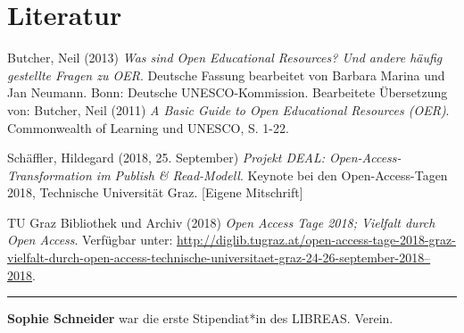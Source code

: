 \documentclass[a4paper,
fontsize=11pt,
oneside,
numbers=noperiodatend,
parskip=half-,
bibliography=totoc,
final
]{scrartcl}
\begin{document}
\hypertarget{literatur}{%
\section{Literatur}\label{literatur}}

Butcher, Neil (2013) \emph{Was sind Open Educational Resources? Und
andere häufig gestellte Fragen zu OER}. Deutsche Fassung bearbeitet von
Barbara Marina und Jan Neumann. Bonn: Deutsche UNESCO-Kommission.
Bearbeitete Übersetzung von: Butcher, Neil (2011) \emph{A Basic Guide to
Open Educational Resources (OER)}. Commonwealth of Learning und UNESCO,
S. 1-22.

Schäffler, Hildegard (2018, 25. September) \emph{Projekt DEAL:
Open-Access-Transformation im Publish \& Read-Modell}. Keynote bei den
Open-Access-Tagen 2018, Technische Universität Graz. {[}Eigene
Mitschrift{]}

TU Graz Bibliothek und Archiv (2018) \emph{Open Access Tage 2018;
Vielfalt durch Open Access}. Verfügbar unter:
\href{http://diglib.tugraz.at/open-access-tage-2018-graz-vielfalt-durch-open-access-technische-universitaet-graz-24-26-september-2018--2018}{http://diglib.tugraz.at/open-access-tage-2018-graz-vielfalt-durch-open-access-tech\-nische-universitaet-graz-24-26-september-2018--2018}.

\pagebreak

\begin{center}\rule{0.5\linewidth}{\linethickness}\end{center}

\textbf{Sophie Schneider} war die erste Stipendiat*in des LIBREAS.
Verein.
\end{document}
